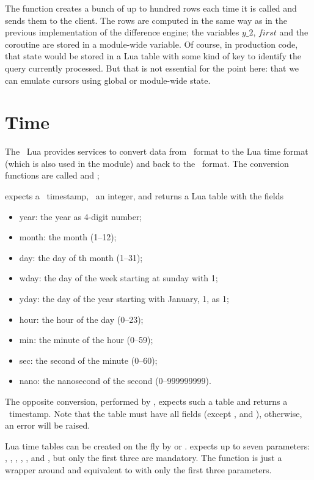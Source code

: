 \clearpage
The function creates a bunch of
up to hundred rows each time it is called
and sends them to the client.
The rows are computed in the same way
as in the previous implementation of
the difference engine;
the variables $y\_2$, $first$ and
the coroutine  are stored
in a module-wide variable.
Of course, in production code,
that state would be stored
in a Lua table with some kind
of key to identify the query
currently processed. But that
is not essential for the point
here: that we can emulate cursors
using global or module-wide state.

\section{Time}
The \nowdb\ Lua 
provides services to convert
data from \nowdb\ format to
the Lua time format (which is also
used in the  module)
and back to the \nowdb\ format.
The conversion functions are
called  and ;

 expects a \nowdb\ timestamp,
\ie\ an integer, and returns a Lua table with
the fields

\begin{itemize}
\item year: the year as 4-digit number;
\item month: the month (1--12);
\item day: the day of th month (1--31);
\item wday: the day of the week starting at sunday with 1;
\item yday: the day of the year starting with January, 1, as 1;
\item hour: the hour of the day (0--23);
\item min: the minute of the hour (0--59);
\item sec: the second of the minute (0--60);
\item nano: the nanosecond of the second (0--999999999).
\end{itemize}

The opposite conversion, performed by , expects
such a table and returns a \nowdb\ timestamp.
Note that the table must have all fields
(except ,  and ), otherwise,
an error will be raised.

Lua time tables can be created on the fly
by  or .
 expects up to seven parameters:
, , ,
, , 
and , but only the first three
are mandatory. The  function
is just a wrapper around  and
equivalent to  with only
the first three parameters.

